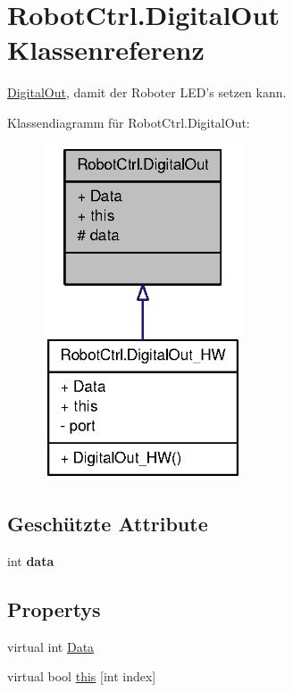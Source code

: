 \hypertarget{class_robot_ctrl_1_1_digital_out}{
\section{RobotCtrl.DigitalOut Klassenreferenz}
\label{class_robot_ctrl_1_1_digital_out}
}


\hyperlink{class_robot_ctrl_1_1_digital_out}{DigitalOut}, damit der Roboter LED's setzen kann.  




Klassendiagramm für RobotCtrl.DigitalOut:\nopagebreak
\begin{figure}[H]
\begin{center}
\leavevmode
\includegraphics[width=168pt]{class_robot_ctrl_1_1_digital_out__inherit__graph}
\end{center}
\end{figure}
\subsection*{Geschützte Attribute}
\begin{DoxyCompactItemize}
\item 
\hypertarget{class_robot_ctrl_1_1_digital_out_aefd56fa4fcdd5ba7eb3f34545cc090a6}{
int {\bfseries data}}
\label{class_robot_ctrl_1_1_digital_out_aefd56fa4fcdd5ba7eb3f34545cc090a6}

\end{DoxyCompactItemize}
\subsection*{Propertys}
\begin{DoxyCompactItemize}
\item 
virtual int \hyperlink{class_robot_ctrl_1_1_digital_out_a4c85a4bab149666840e9a551f62b6305}{Data}
\item 
virtual bool \hyperlink{class_robot_ctrl_1_1_digital_out_a4f57b73a7591bb053e7025eebb26d577}{this} \mbox{[}int index\mbox{]}
\end{DoxyCompactItemize}


